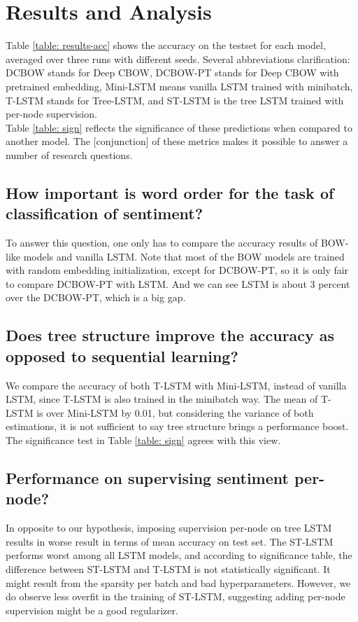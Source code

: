 \section{Results and Analysis}
\label{sec: results}
Table \ref{table: results-acc} shows the accuracy on the testset for each model,
averaged over three runs with different seeds. Several abbreviations
clarification: DCBOW stands for Deep CBOW, DCBOW-PT stands for Deep CBOW with
pretrained embedding, Mini-LSTM means vanilla LSTM trained with minibatch,
T-LSTM stands for Tree-LSTM, and ST-LSTM is the tree LSTM trained with per-node
supervision. \\ Table \ref{table: sign} reflects the significance of these
predictions when compared to another model. The [conjunction] of these metrics
makes it possible to answer a number of research questions. \\
    \vspace{-10pt}
    \subsection{How important is word order for the task of classification of sentiment?} To answer this question, one only has to compare the accuracy
    results of BOW-like models and vanilla LSTM. Note that most of the BOW
    models are trained with random embedding initialization, except for
    DCBOW-PT, so it is only fair to compare DCBOW-PT with LSTM. And we
    can see LSTM is about 3 percent over the DCBOW-PT, which is a big gap.
    \subsection{Does tree structure improve the accuracy as opposed to
    sequential learning?} We compare the accuracy of both T-LSTM with Mini-LSTM,
    instead of vanilla LSTM, since T-LSTM is also trained in the minibatch way. The
    mean of T-LSTM is over Mini-LSTM by 0.01, but considering the variance of both estimations, it is not sufficient to say tree structure brings a
    performance boost. The significance test in Table \ref{table: sign} agrees
    with this view.
    \subsection{Performance on supervising sentiment per-node?} 
    In opposite to our hypothesis, imposing supervision per-node on tree LSTM
    results in worse result in terms of mean accuracy on test set. The ST-LSTM
    performs worst among all LSTM models, and according to significance table,
    the difference between ST-LSTM and T-LSTM is not statistically significant. It might result from the sparsity per batch and bad hyperparameters. However, we do observe less overfit in the training of ST-LSTM, suggesting adding per-node supervision might be a good regularizer.

